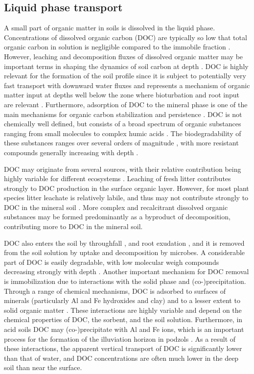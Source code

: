 \documentclass[11pt, oneside, a4paper]{article}   	%
\begin{document}
\subsection{Liquid phase transport}
A small part of organic matter in soils is dissolved in the liquid phase. Concentrations of dissolved organic carbon (DOC) are typically so low that total organic
carbon in solution is negligible compared to the immobile fraction \citep{Michalzik2001}. However, leaching and decomposition fluxes of dissolved organic matter may
be important terms in shaping the dynamics of soil carbon at depth \citep{Kalbitz2008, Kindler2011, Kaiser2012}. DOC is highly relevant for the formation of the soil profile since it is subject to potentially very fast transport with downward water fluxes and represents a
mechanism of organic matter input at depths well below the zone where bioturbation and root input are relevant \citep{Rumpel2012}. Furthermore, adsorption of
DOC to the mineral phase is one of the main mechanisms for organic carbon stabilization and persistence \citep{Kalbitz2008}.
DOC is not chemically well defined, but consists of a broad spectrum of organic substances ranging from small molecules to complex humic acids
\citep{Kalbitz2000, Michalzik2001}. The biodegradability of these substances
ranges over several orders of magnitude \citep{Kalbitz2000}, with more resistant
compounds generally increasing with depth \citep{Kalbitz2000, Sanderman2008}.

DOC may originate from several sources, with their relative contribution being highly variable for different ecosystems
\citep{Kalbitz2000, Chantigny2003}. Leaching of fresh litter contributes strongly to
DOC production in the surface organic layer. However, for most plant
species litter leachate is relatively labile, and thus may not contribute strongly to
DOC in the mineral soil \citep{Neff2001}. More complex and recalcitrant
dissolved organic substances may be formed predominantly as a byproduct of decomposition, 
contributing more to DOC in the mineral soil. 

DOC also enters the soil by
throughfall \citep{Michalzik2001}, and root exudation \citep{Neff2001}, 
and it is removed from the soil solution by uptake and decomposition by microbes. 
A considerable part of DOC is easily degradable, with low molecular weigh compounds decreasing strongly
with depth \citep{Roth2019}. Another important mechanism for DOC removal
is immobilization due to interactions with the solid phase and (co-)precipitation.
Through a range of chemical mechanisms, DOC is adsorbed to surfaces of minerals (particularly Al and Fe hydroxides and clay) and to a lesser extent to solid organic
matter \citep{Neff2001}. These interactions are highly variable and depend
on the chemical properties of DOC, the sorbent, and the soil solution. Furthermore,
in acid soils DOC may (co-)precipitate with Al and Fe ions, which is an important
process for the formation of the illuviation horizon in podzols \citep{vanBreemen1997}. As a result of these interactions, the apparent vertical transport of DOC is significantly lower than that of water, and DOC concentrations are often much lower in
the deep soil than near the surface. 
\end{document}
